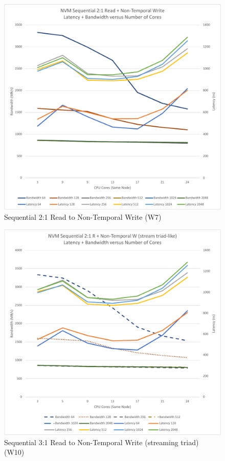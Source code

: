 \begin{figure}
    \centering
    \caption{Sequential 2:1 Read to Non-Temporal Write (W7)}\label{chart:sequential:W7}
    \includegraphics[scale=0.5]{charts/sequential-w7-crop.pdf}
\end{figure}


\begin{figure}
    \centering
    \caption{Sequential 3:1 Read to Non-Temporal Write (streaming triad) (W10)}\label{chart:sequential:W10}
    \includegraphics[scale=0.5]{charts/sequential-w10-crop.pdf}
\end{figure}

